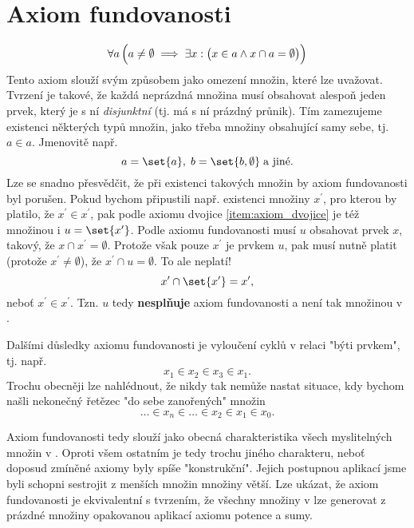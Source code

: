 \section{Axiom fundovanosti}\label{sec:axiom_fundovanosti}
\begin{equation*}
    \forall a\,\Bigl(a\neq\emptyset \implies \exists x:\bigl(x\in a \land x\cap a=\emptyset\bigr)\Bigr)
\end{equation*}
Tento axiom slouží svým způsobem jako omezení množin, které lze uvažovat. Tvrzení je takové, že každá neprázdná množina musí obsahovat alespoň jeden prvek, který je s ní \emph{disjunktní} (tj. má s ní prázdný průnik). Tím zamezujeme existenci některých typů množin, jako třeba množiny obsahující samy sebe, tj. $a\in a$. Jmenovitě např.
\begin{equation*}
    a=\set{a},\;b=\set{b,\emptyset}\;\text{a jiné.}
\end{equation*}
Lze se snadno přesvědčit, že při existenci takových množin by axiom fundovanosti byl porušen. Pokud bychom připustili např. existenci množiny $x^\prime$, pro kterou by platilo, že $x^\prime\in x^\prime$, pak podle axiomu dvojice \ref{item:axiom_dvojice} je též množinou i $u=\set{x^\prime}$. Podle axiomu fundovanosti musí $u$ obsahovat prvek $x$, takový, že $x\cap x^\prime=\emptyset$. Protože však pouze $x^\prime$ je prvkem $u$, pak musí nutně platit (protože $x^\prime\neq\emptyset$), že $x^\prime\cap u=\emptyset$. To ale neplatí!
\begin{equation*}
    x^\prime\cap\set{x^\prime}=x^\prime,
\end{equation*}
neboť $x^\prime\in x^\prime$. Tzn. $u$ tedy \textbf{nesplňuje} axiom fundovanosti a není tak množinou v \ZF{}.\par
Dalšími důsledky axiomu fundovanosti je vyloučení cyklů v relaci "býti prvkem", tj. např.
\begin{equation*}
    x_1\in x_2\in x_3\in x_1.
\end{equation*}
Trochu obecněji lze nahlédnout, že nikdy tak nemůže nastat situace, kdy bychom našli nekonečný řetězec "do sebe zanořených" množin
\begin{equation*}
    \dots \in x_n\in \dots\in x_2\in x_1\in x_0.
\end{equation*}
\medskip

Axiom fundovanosti tedy slouží jako obecná charakteristika všech myslitelných množin v \ZF{}. Oproti všem ostatním je tedy trochu jiného charakteru, neboť doposud zmíněné axiomy byly spíše "konstrukční". Jejich postupnou aplikací jsme byli schopni sestrojit z menších množin množiny větší. Lze ukázat, že axiom fundovanosti je ekvivalentní s tvrzením, že všechny množiny v \ZF{} lze generovat z prázdné množiny opakovanou aplikací axiomu potence a sumy.